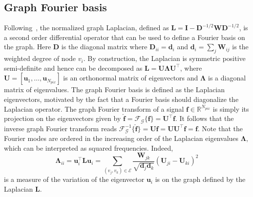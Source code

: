 \documentclass[final,twocolumn,3p,times,authoryear]{elsarticle}
\renewcommand{\b}[1]{{\bm{#1}}}   %
\newcommand{\1}{\b{1}}              %
\newcommand{\0}{\b{0}}              %
\newcommand{\G}{\mathcal{G}}
\newcommand{\E}{\mathcal{E}}
\renewcommand{\L}{\b{L}}
\newcommand{\W}{\b{W}}
\newcommand{\I}{\b{I}}
\newcommand{\D}{\b{D}}
\newcommand{\U}{\b{U}}
\newcommand{\f}{\b{f}}
\newcommand{\trans}{^\intercal}
\newcommand{\R}{\mathbb{R}}
\newcommand{\bLambda}{\b{\Lambda}}
\begin{document}

\subsection{Graph Fourier basis}

Following~\cite{shuman2013emerging}, the normalized graph Laplacian,
defined as $\L = \I - \D^{-1/2} \W \D^{-1/2}$, is a second order differential operator
that can be used to define a Fourier basis on the graph. Here $\D$ is the diagonal
matrix where $\D_{ii} = \b{d}_i$ and $\b{d}_i = \sum_j \W_{ij}$ is the weighted degree of node $v_i$. By construction, the Laplacian is symmetric positive
semi-definite and hence can be decomposed as $\L = \U \bLambda \U\trans$, where $\U = [\b u_1, \ldots, \b u_{N_{pix}}]$ is an
orthonormal matrix of eigenvectors and $\bLambda$ is a diagonal matrix of
eigenvalues. The graph Fourier basis is defined as the Laplacian eigenvectors, motivated by the fact that a Fourier basis should diagonalize the Laplacian operator.
The graph Fourier transform of a signal $\f \in \R^{N_{pix}}$ is simply its projection on the eigenvectors given by
$\hat{\f} = \mathcal{F}_\G \{\f\} = \U\trans \f$. It follows that the inverse graph Fourier transform reads $\mathcal{F}^{-1}_\G \{\hat{\f}\} = \U\hat{\f} = \U \U\trans \f = \f$.
Note that the Fourier modes are ordered in the increasing order of the Laplacian eigenvalues $\bLambda$, which can be interpreted as squared frequencies.
Indeed,
\begin{equation*}
	\bLambda_{ii} = \b u_i\trans \L \b u_i = \sum_{(v_j, v_k) \in \E} \frac{\W_{jk}}{\sqrt{\b d_j \b d_k}} (\U_{ji} - \U_{ki})^2
\end{equation*}
is a measure of the variation of the eigenvector $\b u_i$ is on the graph defined by the Laplacian $\L$.
\end{document}
